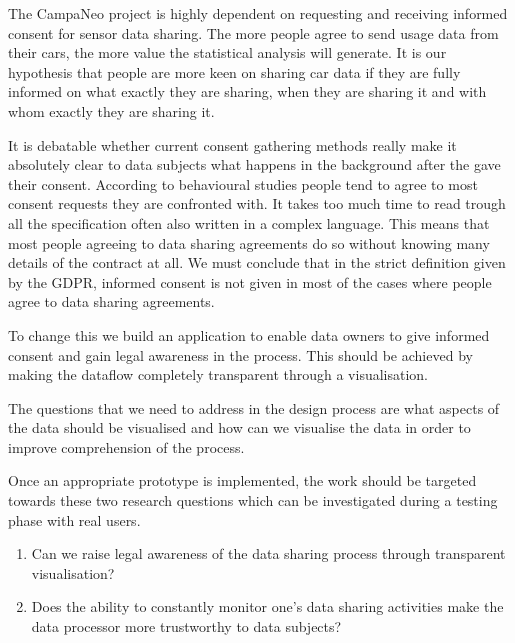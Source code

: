 
The CampaNeo project is highly dependent on requesting and receiving  informed consent for sensor data sharing. 
The more people agree to send usage data from their cars, the more value the statistical analysis will generate.
It is our hypothesis that people are more keen on sharing car data if they are fully informed on what exactly they are sharing, when they are sharing it and with whom exactly they are sharing it.

It is debatable whether current consent gathering methods really make it absolutely clear to data subjects what happens in the background after the gave their consent. According to behavioural studies people tend to agree to most consent requests they are confronted with.\cite{Borgesisus_informed_consent_2015}
It takes too much time to read trough all the specification often also written in a complex language.
This means that most people agreeing to data sharing agreements do so without knowing many details of the contract at all. We must conclude that in the strict definition given by the GDPR, informed consent is not given in most of the cases where people agree to data sharing agreements.

To change this we build an application to enable data owners to give informed consent and gain legal awareness in the process. This should be achieved by making the dataflow completely transparent through a visualisation.

The questions that we need to address in the design process are
what aspects of the data should be visualised and how can we visualise the data in order to improve comprehension of the process.

Once an appropriate prototype is implemented, the work should be targeted towards these two research questions which can be investigated during a testing phase with real users.

\begin{enumerate}
    \item Can we raise legal awareness of the data sharing process through transparent visualisation?
    \item Does the ability to constantly monitor one's data sharing activities make the data processor more trustworthy to data subjects?
\end{enumerate}


